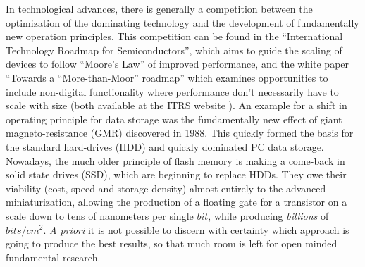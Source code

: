 



In technological advances, there is generally a competition between the optimization of the dominating technology and the development of fundamentally new operation principles. This competition can be found in the ``International Technology Roadmap for Semiconductors'', which aims to guide the scaling of devices to follow ``Moore's Law'' of improved performance, and the white paper ``Towards a ``More-than-Moor'' roadmap'' which examines opportunities to include non-digital functionality where performance don't necessarily have to scale with size (both available at the ITRS website  \cite{itrs_road_map_itrs_2015}). An example for a shift in operating principle for data storage was the fundamentally new effect of giant magneto-resistance (GMR) discovered in 1988. This quickly formed the basis for the standard hard-drives (HDD) and quickly dominated PC data storage. Nowadays, the much older principle of flash memory is making a come-back in solid state drives (SSD), which are beginning to replace HDDs. They owe their viability (cost, speed and storage density) almost entirely to the advanced miniaturization, allowing the production of a floating gate for a transistor on a scale down to tens of nanometers per single $bit$, while producing \emph{billions} of $bits/cm^{2}$. \emph{A priori} it is not possible to discern with certainty which approach is going to produce the best results, so that much room is left for open minded fundamental research.

